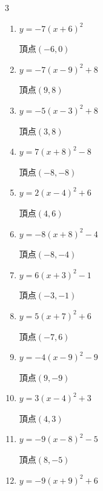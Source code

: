 \begin{multicols}{3}
\begin{enumerate}
        $\displaystyle 頂点\left( -9 , 4 \right)$

  \item $\displaystyle y=-7\left( x+6\right)^{2}$

        $\displaystyle 頂点\left( -6 , 0 \right)$

  \item $\displaystyle y=-7\left( x-9\right)^{2}+8$

        $\displaystyle 頂点\left( 9 , 8 \right)$

  \item $\displaystyle y=-5\left( x-3\right)^{2}+8$

        $\displaystyle 頂点\left( 3 , 8 \right)$

  \item $\displaystyle y=7\left( x+8\right)^{2}-8$

        $\displaystyle 頂点\left( -8 , -8 \right)$

  \item $\displaystyle y=2\left( x-4\right)^{2}+6$

        $\displaystyle 頂点\left( 4 , 6 \right)$

  \item $\displaystyle y=-8\left( x+8\right)^{2}-4$

        $\displaystyle 頂点\left( -8 , -4 \right)$

  \item $\displaystyle y=6\left( x+3\right)^{2}-1$

        $\displaystyle 頂点\left( -3 , -1 \right)$

  \item $\displaystyle y=5\left( x+7\right)^{2}+6$

        $\displaystyle 頂点\left( -7 , 6 \right)$

  \item $\displaystyle y=-4\left( x-9\right)^{2}-9$

        $\displaystyle 頂点\left( 9 , -9 \right)$

  \item $\displaystyle y=3\left( x-4\right)^{2}+3$

        $\displaystyle 頂点\left( 4 , 3 \right)$

  \item $\displaystyle y=-9\left( x-8\right)^{2}-5$

        $\displaystyle 頂点\left( 8 , -5 \right)$

  \item $\displaystyle y=-9\left( x+9\right)^{2}+6$


\end{enumerate}
\end{multicols}
